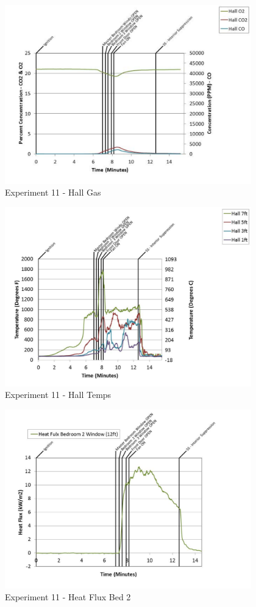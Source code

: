 \documentclass{article}
\begin{document}
\begin{appendices}
	\clearpage

	\begin{figure}[h!]
		\centering
		\includegraphics[height=3.05in]{0_Images/Results_Charts/Exp_11_Charts/HallGas.pdf}
		\caption{Experiment 11 - Hall Gas}
	\end{figure}
 

	\begin{figure}[h!]
		\centering
		\includegraphics[height=3.05in]{0_Images/Results_Charts/Exp_11_Charts/HallTemps.pdf}
		\caption{Experiment 11 - Hall Temps}
	\end{figure}
 
	\clearpage

	\begin{figure}[h!]
		\centering
		\includegraphics[height=3.05in]{0_Images/Results_Charts/Exp_11_Charts/HeatFluxBed2.pdf}
		\caption{Experiment 11 - Heat Flux Bed 2}
	\end{figure}
 


\end{appendices}
\end{document}
